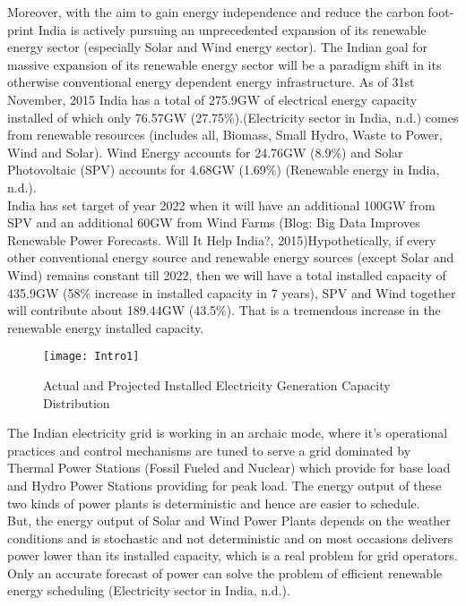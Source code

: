 Moreover, with the aim to gain energy independence and reduce the carbon foot-print India is actively pursuing an unprecedented expansion of its renewable energy sector (especially Solar and Wind energy sector). The Indian goal for massive expansion of its renewable energy sector will be a paradigm shift in its otherwise conventional energy dependent energy infrastructure.
As of 31st November, 2015 India has a total of 275.9GW of electrical energy capacity installed of which only 76.57GW (27.75\%).(Electricity sector in India, n.d.) comes from renewable resources (includes all, Biomass, Small Hydro, Waste to Power, Wind and Solar). Wind Energy accounts for 24.76GW (8.9\%) and Solar Photovoltaic (SPV) accounts for 4.68GW (1.69\%) (Renewable energy in India, n.d.).\\

India has set target of year 2022 when it will have an additional 100GW from SPV and an additional 60GW from Wind Farms (Blog: Big Data Improves Renewable Power Forecasts. Will It Help India?, 2015)Hypothetically, if every other conventional energy source and renewable energy sources (except Solar and Wind) remains constant till 2022, then we will have a total installed capacity of 435.9GW (58\% increase in installed capacity in 7 years), SPV and Wind together will contribute about 189.44GW (43.5\%). That is a tremendous increase in the renewable energy installed capacity.

\begin{figure}[H]
\centering
\texttt{[image: Intro1]}
\caption{Actual and Projected Installed Electricity Generation Capacity Distribution}
\label{figc1h1} %
\end{figure}

The Indian electricity grid is working in an archaic mode, where it’s operational practices and control mechanisms are tuned to serve a grid dominated by Thermal Power Stations (Fossil Fueled and Nuclear) which provide for base load and Hydro Power Stations providing for peak load. The energy output of these two kinds of power plants is deterministic and hence are easier to schedule.\\

But, the energy output of Solar and Wind Power Plants depends on the weather conditions and is stochastic and not deterministic and on most occasions delivers power lower than its installed capacity, which is a real problem for grid operators. Only an accurate forecast of power can solve the problem of efficient renewable energy scheduling (Electricity sector in India, n.d.).\\

